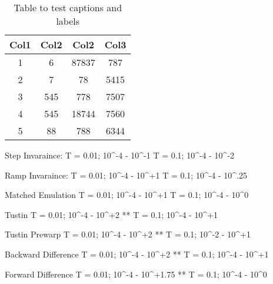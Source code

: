 \begin{table}[h!]
\centering
\begin{tabular}{||c c c c||} 
 \hline
 Col1 & Col2 & Col2 & Col3 \\ [0.5ex] 
 \hline\hline
 1 & 6 & 87837 & 787 \\ 
 2 & 7 & 78 & 5415 \\
 3 & 545 & 778 & 7507 \\
 4 & 545 & 18744 & 7560 \\
 5 & 88 & 788 & 6344 \\ [1ex] 
 \hline
\end{tabular}
\caption{Table to test captions and labels}
\label{table:1}
\end{table}


Step Invaraince:
T = 0.01; 10^-4 - 10^-1 
T = 0.1;  10^-4 - 10^-2

Ramp Invaraince: 
T = 0.01; 10^-4 - 10^+1
T = 0.1;  10^-4 - 10^.25

Matched Emulation
T = 0.01; 10^-4 - 10^+1
T = 0.1;  10^-4 - 10^0

Tustin
T = 0.01; 10^-4 - 10^+2 **
T = 0.1;  10^-4 - 10^+1

Tustin Prewarp
T = 0.01; 10^-4 - 10^+2 **
T = 0.1;  10^-2 - 10^+1

Backward Difference
T = 0.01; 10^-4 - 10^+2 **
T = 0.1;  10^-4 - 10^+1

Forward Difference
T = 0.01; 10^-4 - 10^+1.75 **
T = 0.1;  10^-4 - 10^0